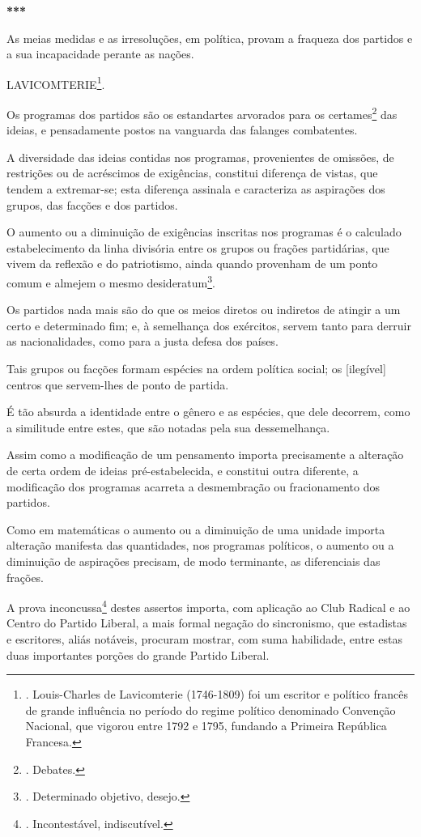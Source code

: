 \textbf{***}

As meias medidas e as irresoluções, em política, provam a fraqueza dos
partidos e a sua incapacidade perante as nações.

LAVICOMTERIE\footnote{. Louis-Charles de Lavicomterie (1746-1809) foi um
  escritor e político francês de grande influência no período do regime
  político denominado Convenção Nacional, que vigorou entre 1792 e 1795,
  fundando a Primeira República Francesa.}.

Os programas dos partidos são os estandartes arvorados para os
certames\footnote{. Debates.} das ideias, e pensadamente postos na
vanguarda das falanges combatentes.

A diversidade das ideias contidas nos programas, provenientes de
omissões, de restrições ou de acréscimos de exigências, constitui
diferença de vistas, que tendem a extremar-se; esta diferença assinala e
caracteriza as aspirações dos grupos, das facções e dos partidos.

O aumento ou a diminuição de exigências inscritas nos programas é o
calculado estabelecimento da linha divisória entre os grupos ou frações
partidárias, que vivem da reflexão e do patriotismo, ainda quando
provenham de um ponto comum e almejem o mesmo desideratum\footnote{.
  Determinado objetivo, desejo.}.

Os partidos nada mais são do que os meios diretos ou indiretos de
atingir a um certo e determinado fim; e, à semelhança dos exércitos,
servem tanto para derruir as nacionalidades, como para a justa defesa
dos países.

Tais grupos ou facções formam espécies na ordem política social; os
{[}ilegível{]} centros que servem-lhes de ponto de partida.

É tão absurda a identidade entre o gênero e as espécies, que dele
decorrem, como a similitude entre estes, que são notadas pela sua
dessemelhança.

Assim como a modificação de um pensamento importa precisamente a
alteração de certa ordem de ideias pré-estabelecida, e constitui outra
diferente, a modificação dos programas acarreta a desmembração ou
fracionamento dos partidos.

Como em matemáticas o aumento ou a diminuição de uma unidade importa
alteração manifesta das quantidades, nos programas políticos, o aumento
ou a diminuição de aspirações precisam, de modo terminante, as
diferenciais das frações.

A prova inconcussa\footnote{. Incontestável, indiscutível.} destes
assertos importa, com aplicação ao Club Radical e ao Centro do Partido
Liberal, a mais formal negação do sincronismo, que estadistas e
escritores, aliás notáveis, procuram mostrar, com suma habilidade, entre
estas duas importantes porções do grande Partido Liberal.

